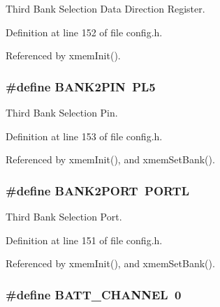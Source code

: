 Third Bank Selection Data Direction Register. 



Definition at line 152 of file config.\-h.



Referenced by xmem\-Init().

\hypertarget{group__config_ga74c95f6ccdb5e482e97a5af53ed74229}{
\subsubsection[{B\-A\-N\-K2\-P\-I\-N}]{\setlength{\rightskip}{0pt plus 5cm}\#define B\-A\-N\-K2\-P\-I\-N~P\-L5}}\label{group__config_ga74c95f6ccdb5e482e97a5af53ed74229}


Third Bank Selection Pin. 



Definition at line 153 of file config.\-h.



Referenced by xmem\-Init(), and xmem\-Set\-Bank().

\hypertarget{group__config_gad35afb0251524c201c2d60f3d035af32}{
\subsubsection[{B\-A\-N\-K2\-P\-O\-R\-T}]{\setlength{\rightskip}{0pt plus 5cm}\#define B\-A\-N\-K2\-P\-O\-R\-T~P\-O\-R\-T\-L}}\label{group__config_gad35afb0251524c201c2d60f3d035af32}


Third Bank Selection Port. 



Definition at line 151 of file config.\-h.



Referenced by xmem\-Init(), and xmem\-Set\-Bank().

\hypertarget{group__config_ga9fd748b19523c96052a2964d73a7b0f5}{
\subsubsection[{B\-A\-T\-T\-\_\-\-C\-H\-A\-N\-N\-E\-L}]{\setlength{\rightskip}{0pt plus 5cm}\#define B\-A\-T\-T\-\_\-\-C\-H\-A\-N\-N\-E\-L~0}}\label{group__config_ga9fd748b19523c96052a2964d73a7b0f5}


